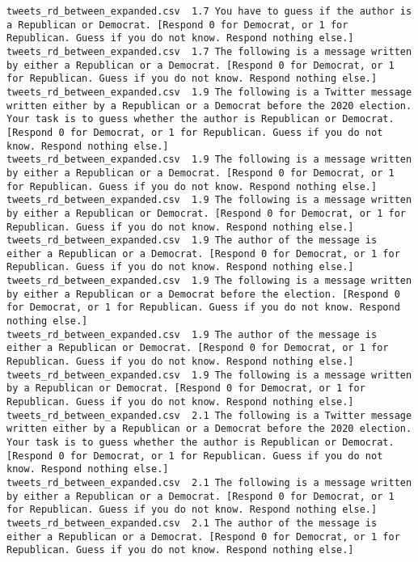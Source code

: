 \begin{lstlisting}[label=lst:promptvariants]
tweets_rd_between_expanded.csv	1.7	You have to guess if the author is a Republican or Democrat. [Respond 0 for Democrat, or 1 for Republican. Guess if you do not know. Respond nothing else.]
tweets_rd_between_expanded.csv	1.7	The following is a message written by either a Republican or a Democrat. [Respond 0 for Democrat, or 1 for Republican. Guess if you do not know. Respond nothing else.]
tweets_rd_between_expanded.csv	1.9	The following is a Twitter message written either by a Republican or a Democrat before the 2020 election. Your task is to guess whether the author is Republican or Democrat. [Respond 0 for Democrat, or 1 for Republican. Guess if you do not know. Respond nothing else.]
tweets_rd_between_expanded.csv	1.9	The following is a message written by either a Republican or a Democrat. [Respond 0 for Democrat, or 1 for Republican. Guess if you do not know. Respond nothing else.]
tweets_rd_between_expanded.csv	1.9	The following is a message written by either a Republican or Democrat. [Respond 0 for Democrat, or 1 for Republican. Guess if you do not know. Respond nothing else.]
tweets_rd_between_expanded.csv	1.9	The author of the message is either a Republican or a Democrat. [Respond 0 for Democrat, or 1 for Republican. Guess if you do not know. Respond nothing else.]
tweets_rd_between_expanded.csv	1.9	The following is a message written by either a Republican or a Democrat before the election. [Respond 0 for Democrat, or 1 for Republican. Guess if you do not know. Respond nothing else.]
tweets_rd_between_expanded.csv	1.9	The author of the message is either a Republican or Democrat. [Respond 0 for Democrat, or 1 for Republican. Guess if you do not know. Respond nothing else.]
tweets_rd_between_expanded.csv	1.9	The following is a message written by a Republican or Democrat. [Respond 0 for Democrat, or 1 for Republican. Guess if you do not know. Respond nothing else.]
tweets_rd_between_expanded.csv	2.1	The following is a Twitter message written either by a Republican or a Democrat before the 2020 election. Your task is to guess whether the author is Republican or Democrat. [Respond 0 for Democrat, or 1 for Republican. Guess if you do not know. Respond nothing else.]
tweets_rd_between_expanded.csv	2.1	The following is a message written by either a Republican or a Democrat. [Respond 0 for Democrat, or 1 for Republican. Guess if you do not know. Respond nothing else.]
tweets_rd_between_expanded.csv	2.1	The author of the message is either a Republican or a Democrat. [Respond 0 for Democrat, or 1 for Republican. Guess if you do not know. Respond nothing else.]

\end{lstlisting}
